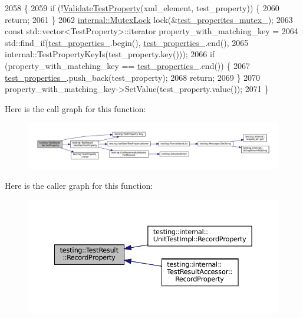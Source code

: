 \begin{DoxyCode}
2058                                                                    \{
2059   \textcolor{keywordflow}{if} (!\hyperlink{classtesting_1_1TestResult_a818c06cd2bfc00d6c81b0cebca044cb1}{ValidateTestProperty}(xml\_element, test\_property)) \{
2060     \textcolor{keywordflow}{return};
2061   \}
2062   \hyperlink{namespacetesting_1_1internal_a08b187c6cc4e28400aadf9a32fccc8de}{internal::MutexLock} lock(&\hyperlink{classtesting_1_1TestResult_a58d7d97bd16a04b932e2863153c13dff}{test\_properites\_mutex\_});
2063   \textcolor{keyword}{const} std::vector<TestProperty>::iterator property\_with\_matching\_key =
2064       std::find\_if(\hyperlink{classtesting_1_1TestResult_a29cde491988faff4ef2d9f9b6c13d9fa}{test\_properties\_}.begin(), \hyperlink{classtesting_1_1TestResult_a29cde491988faff4ef2d9f9b6c13d9fa}{test\_properties\_}.end(),
2065                    internal::TestPropertyKeyIs(test\_property.key()));
2066   \textcolor{keywordflow}{if} (property\_with\_matching\_key == \hyperlink{classtesting_1_1TestResult_a29cde491988faff4ef2d9f9b6c13d9fa}{test\_properties\_}.end()) \{
2067     \hyperlink{classtesting_1_1TestResult_a29cde491988faff4ef2d9f9b6c13d9fa}{test\_properties\_}.push\_back(test\_property);
2068     \textcolor{keywordflow}{return};
2069   \}
2070   property\_with\_matching\_key->SetValue(test\_property.value());
2071 \}
\end{DoxyCode}
Here is the call graph for this function\+:
\nopagebreak
\begin{figure}[H]
\begin{center}
\leavevmode
\includegraphics[width=350pt]{classtesting_1_1TestResult_ac253b0fd7ea70f457e9517e415eac32d_cgraph}
\end{center}
\end{figure}
Here is the caller graph for this function\+:
\nopagebreak
\begin{figure}[H]
\begin{center}
\leavevmode
\includegraphics[width=350pt]{classtesting_1_1TestResult_ac253b0fd7ea70f457e9517e415eac32d_icgraph}
\end{center}
\end{figure}
